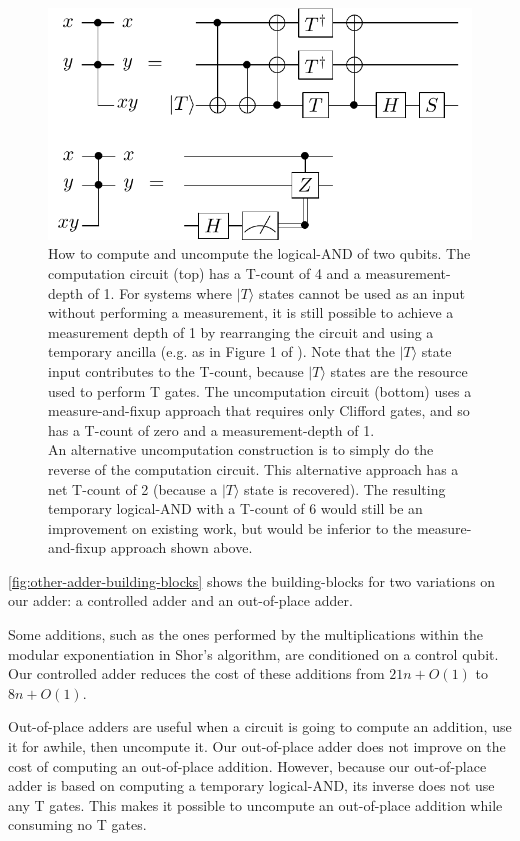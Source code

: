 \documentclass[twocolumn]{quantumarticle-customized}
\begin{document}
\begin{figure}
  \includegraphics[width=\linewidth]{temporary-logical-and.pdf}
  \caption{
	How to compute and uncompute the logical-AND of two qubits.
	The computation circuit (top) has a T-count of 4 and a measurement-depth of 1.
	For systems where $|T\rangle$ states cannot be used as an input without performing a measurement, it is still possible to achieve a measurement depth of 1 by rearranging the circuit and using a temporary ancilla (e.g. as in Figure 1 of \cite{Jones2013}).
	Note that the $|T\rangle$ state input contributes to the T-count, because $|T\rangle$ states are the resource used to perform T gates.
	The uncomputation circuit (bottom) uses a measure-and-fixup approach \cite{Jones2013} that requires only Clifford gates, and so has a T-count of zero and a measurement-depth of 1.
    \\
    An alternative uncomputation construction is to simply do the reverse of the computation circuit.
    This alternative approach has a net T-count of 2 (because a $|T\rangle$ state is recovered).
    The resulting temporary logical-AND with a T-count of 6 would still be an improvement on existing work, but would be inferior to the measure-and-fixup approach shown above.
  }
  \label{fig:temporary-logical-AND}
\end{figure}


\autoref{fig:other-adder-building-blocks} shows the building-blocks for two variations on our adder: a controlled adder and an out-of-place adder.

Some additions, such as the ones performed by the multiplications within the modular exponentiation in Shor's algorithm, are conditioned on a control qubit.
Our controlled adder reduces the cost of these additions from $21n + O(1)$ \cite{Coreas2017} to $8n + O(1)$.

Out-of-place adders are useful when a circuit is going to compute an addition, use it for awhile, then uncompute it.
Our out-of-place adder does not improve on the cost of computing an out-of-place addition.
However, because our out-of-place adder is based on computing a temporary logical-AND, its inverse does not use any T gates.
This makes it possible to uncompute an out-of-place addition while consuming no T gates.
\end{document}
